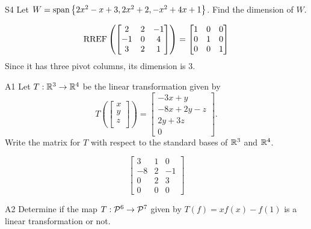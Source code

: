 \documentclass{sbgLAsemi}
\begin{document}
\begin{problem}{S4}
  Let \(
    W={\rm span}\left\{ 2x^2-x+3, 2x^2+2, -x^2+4x+1 \right\}\).
  Find the dimension of \(W\).
\end{problem}
\begin{solution}
  \[\RREF\left(
    \begin{bmatrix}
      2 & 2 & -1 \\
      -1 & 0 & 4 \\
      3 & 2 & 1
    \end{bmatrix} \right)= \begin{bmatrix}
      1 & 0 &0 \\
      0 & 1 & 0 \\
      0 & 0 & 1
    \end{bmatrix}
  \]
  Since it has three pivot columns, its dimension is \(3\).
\end{solution}
\begin{problem}{A1}
Let $T: \IR^3\rightarrow \IR^4$ be the linear transformation given by $$T\left(\begin{bmatrix} x \\ y \\ z \\  \end{bmatrix} \right) = \begin{bmatrix} -3x+y \\ -8x+2y-z \\ 2y+3z \\ 0 \end{bmatrix}.$$  Write the matrix for $T$ with respect to the standard bases of $\IR^3$ and $\IR^4$.
\end{problem}
\begin{solution}
$$\begin{bmatrix} 3 & 1 & 0 \\ -8 & 2 & -1 \\ 0 & 2 & 3 \\ 0 & 0 & 0 \end{bmatrix}$$
\end{solution}

\begin{problem}{A2}
Determine if the map $T: \P^6  \rightarrow \P^7$ given by $T(f) = xf(x)-f(1)$ is a linear transformation or not.
\end{problem}
\end{document}
